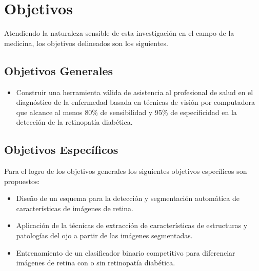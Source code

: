  
 
 


\section{Objetivos}
Atendiendo la naturaleza sensible  de esta investigación en el campo de la medicina,  los  objetivos delineados son los siguientes.

\subsection{Objetivos Generales}

\begin{itemize}
\item Construir una herramienta válida de asistencia al profesional de salud en el diagnóstico de la enfermedad basada en técnicas de visión por computadora que alcance al menos 80\% de sensibilidad y 95\% de especificidad en la detección de la retinopatía diabética.
\end{itemize}
\subsection{Objetivos Específicos}
Para el logro de los objetivos generales los siguientes objetivos específicos son propuestos:
\begin{itemize}


\item Diseño de un esquema para la detección y segmentación automática de características de imágenes de retina.

   
    
    

\item Aplicación de la técnicas de extracción de características de estructuras y patologías del ojo a partir de las imágenes segmentadas.
    
\item Entrenamiento de un clasificador binario competitivo para diferenciar imágenes de retina con o sin retinopatía diabética.



\end{itemize}





